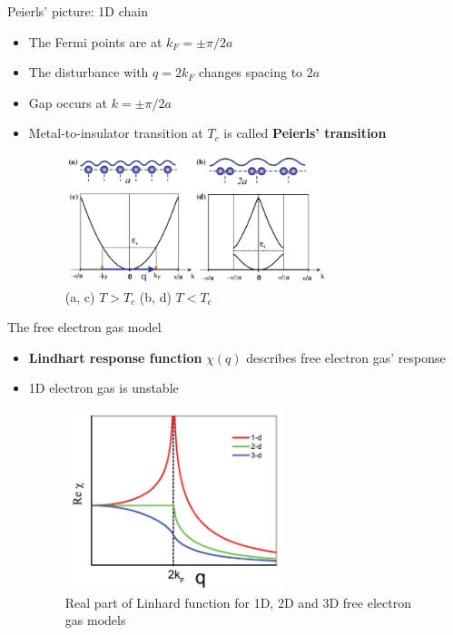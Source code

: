 \documentclass{beamer}
\begin{document}
\begin{frame}{Peierls' picture: 1D chain}
\begin{itemize}
\item The Fermi points are at $k_F = \pm \pi / 2 a$ %
\item The disturbance with $q = 2 k_F$ changes spacing to $2 a$
\item Gap occurs at $k = \pm \pi / 2 a$
\item Metal-to-insulator transition at $T_c$ is called \textbf{Peierls' transition}
\begin{figure}
\includegraphics[width=3in]{figs/density_fermi.pdf}
\caption{\label{fig:density_fermi} (a, c) $T > T_c$ (b, d) $T < T_c$}
\end{figure}
\end{itemize}
\end{frame}

\begin{frame}{The free electron gas model}
\begin{itemize}
\item \textbf{Lindhart response function} $\chi(q)$ describes free electron gas' response
\item 1D electron gas is unstable
\begin{figure}
\includegraphics[width=2.5in]{figs/lindhart.png}
\caption{\label{fig:lindhart} Real part of Linhard function for 1D, 2D and 3D free electron gas models}
\end{figure}
\end{itemize}
\end{frame}
\end{document}
